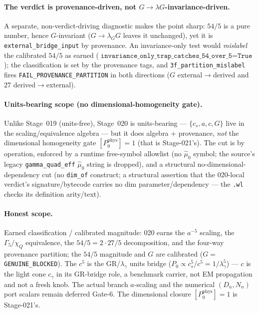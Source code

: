 \paragraph{The verdict is provenance-driven, not \texorpdfstring{\(G\to\lambda G\)}{G->lambda G}-invariance-driven.}
A separate, non-verdict-driving diagnostic makes the point sharp: \(54/5\) is a pure number, hence
\(G\)-invariant (\(G\to\lambda_G G\) leaves it unchanged), yet it is \texttt{external\_bridge\_input} by
provenance. An invariance-only test would \emph{mislabel} the calibrated \(54/5\) as earned
(\(\texttt{invariance\_only\_trap\_catches\_54\_over\_5}=\texttt{True}\)); the classification is set by
the provenance tags, and \texttt{3f\_partition\_mislabel} fires \texttt{FAIL\_PROVENANCE\_PARTITION} in
both directions (\(G\) external\(\to\)derived and \(27\) derived\(\to\)external).

\paragraph{Units-bearing scope (no dimensional-homogeneity gate).}
Unlike Stage~019 (units-free), Stage~020 is units-bearing --- \(\{c_s,a,c,G\}\) live in the
scaling/equivalence algebra --- but it does algebra + provenance, \emph{not} the dimensional
homogeneity gate \([P_0^{\mathrm{phys}}]=1\) (that is Stage-021's). The cut is by operation, enforced by
a runtime free-symbol allowlist (no \(\hat\mu_0\) symbol; the source's legacy \texttt{gamma\_quad\_eff}
\(\hat\mu_0\) string is dropped), and a structural no-dimensional-dependency cut (no \texttt{dim\_of} construct; a structural
assertion that the 020-local verdict's signature/bytecode carries no dim parameter/dependency ---
the \texttt{.wl} checks its definition arity/text).

\paragraph{Honest scope.}
Earned classification / calibrated magnitude: 020 earns the \(a^{-5}\) scaling, the \(\Gamma_5/\chi_Q\)
equivalence, the \(54/5=2\cdot27/5\) decomposition, and the four-way provenance partition; the \(54/5\)
magnitude and \(G\) are calibrated (\(G=\)\texttt{GENUINE\_BLOCKED}). The \(c^5\) is the GR/\(\lambda_\gamma\)
units bridge (\(P_0\propto c_s^5/c^5=1/\lambda_\gamma^5\)) --- \(c\) is the light cone \(c_\gamma\) in its
GR-bridge role, a benchmark carrier, not EM propagation and not a fresh knob. The actual branch
\(a\)-scaling and the numerical \((D_n,N_n)\) port scalars remain deferred Gate-6. The dimensional closure
\([P_0^{\mathrm{phys}}]=1\) is Stage-021's.

